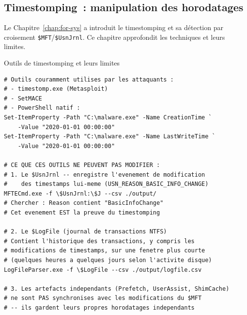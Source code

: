 \subsection{Timestomping~: manipulation des horodatages}

Le Chapitre~\ref{chap:for-sys} a introduit le timestomping et sa
détection par croisement \texttt{\$MFT}/\texttt{\$UsnJrnl}. Ce chapitre
approfondit les techniques et leurs limites.

\begin{boxoutils}{Outils de timestomping et leurs limites}
\begin{lstlisting}[language=bash_forensique]
# Outils couramment utilises par les attaquants :
# - timestomp.exe (Metasploit)
# - SetMACE
# - PowerShell natif :
Set-ItemProperty -Path "C:\malware.exe" -Name CreationTime `
    -Value "2020-01-01 00:00:00"
Set-ItemProperty -Path "C:\malware.exe" -Name LastWriteTime `
    -Value "2020-01-01 00:00:00"

# CE QUE CES OUTILS NE PEUVENT PAS MODIFIER :
# 1. Le $UsnJrnl -- enregistre l'evenement de modification
#    des timestamps lui-meme (USN_REASON_BASIC_INFO_CHANGE)
MFTECmd.exe -f \$UsnJrnl:\$J --csv ./output/
# Chercher : Reason contient "BasicInfoChange"
# Cet evenement EST la preuve du timestomping

# 2. Le $LogFile (journal de transactions NTFS)
# Contient l'historique des transactions, y compris les
# modifications de timestamps, sur une fenetre plus courte
# (quelques heures a quelques jours selon l'activite disque)
LogFileParser.exe -f \$LogFile --csv ./output/logfile.csv

# 3. Les artefacts independants (Prefetch, UserAssist, ShimCache)
# ne sont PAS synchronises avec les modifications du $MFT
# -- ils gardent leurs propres horodatages independants
\end{lstlisting}
\end{boxoutils}

